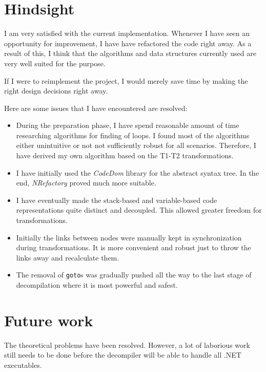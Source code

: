 \documentclass[12pt,twoside,notitlepage]{report}
\begin{document}
\section{Hindsight}

I am very satisfied with the current implementation.
Whenever I have seen an opportunity for improvement,
I have have refactored the code right away.
As a result of this, I think that the algorithms and data structures 
currently used are very well suited for the purpose.

If I were to reimplement the project, I would merely
save time by making the right design decisions right away.

Here are some issues that I have encountered are resolved:

\begin{itemize}
	\item During the preparation phase, I have spend reasonable
	amount of time researching algorithms for finding of loops.
	I found most of the algorithms either unintuitive or not
	not sufficiently robust for all scenarios.
	Therefore, I have derived my own algorithm based on the
	T1-T2 transformations.
	\item I have initially used the \emph{CodeDom} library
	for the abstract syntax tree.  
	In the end, \emph{NRefactory} proved much more suitable.
	\item I have eventually made the stack-based and
	variable-based code representations quite distinct and
	decoupled.  This allowed greater freedom for transformations.
	\item Initially the links between nodes were manually kept
	in synchronization during transformations.
	It is more convenient and robust just to throw the links away
	and recalculate them.
	\item The removal of \verb|goto|s was gradually pushed
	all the way to the last stage of decompilation where it is
	most powerful and safest.
\end{itemize}

\section{Future work}

The theoretical problems have been resolved.
However, a lot of laborious work still needs to be done before
the decompiler will be able to handle all .NET executables.
\end{document}
